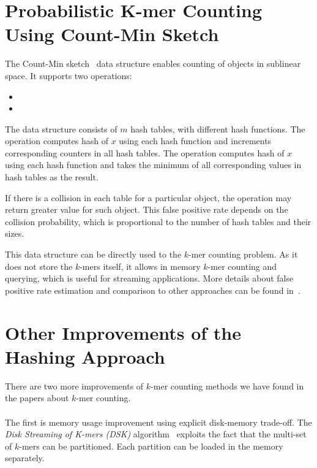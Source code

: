 \section[Probabilistic K-mer Counting]{Probabilistic K-mer Counting Using Count-Min Sketch}

The Count-Min sketch~\cite{countminsketch} data structure enables counting of objects in sublinear space. It supports two operations:
\begin{itemize}
  \item {} %
  \item {} %
\end{itemize}

The data structure consists of $m$ hash tables, with different hash functions.
The  operation computes hash of $x$ using each hash function and increments corresponding counters in all hash tables. The  operation computes hash of $x$ using each hash function and takes the minimum of all corresponding values in hash tables as the result. %

If there is a collision in each table for a particular object, the  operation may return greater value for such object. This false positive rate depends on the collision probability, which is proportional to the number of hash tables and their sizes.

This data structure can be directly used to the $k$-mer counting problem. As it does not store the $k$-mers itself, it allows in memory $k$-mer counting and querying, which is useful for streaming applications.
More details about false positive rate estimation and comparison to other approaches can be found in~\cite{khmer}.

\section[Other Improvements]{Other Improvements of the Hashing Approach}

There are two more improvements of $k$-mer counting methods we have found in the papers about $k$-mer counting.

\paragraph{} The first is memory usage improvement using explicit disk-memory trade-off. The \emph{Disk Streaming of K-mers (DSK)} algorithm~\cite{dsk} exploits the fact that the multi-set of $k$-mers can be partitioned. Each partition can be loaded in the memory separately.

